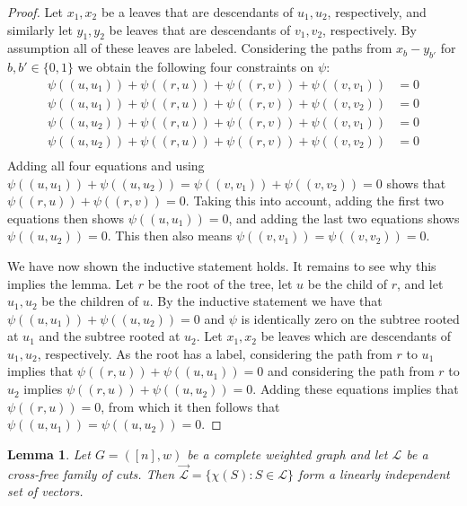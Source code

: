 \documentclass[10pt,a4paper]{article}
\newcommand{\Lcal}{\mathcal{L}}
\newcommand{\1}{\mathbf{1}}
\newtheorem{lemma}[theorem]{Lemma}
\theoremstyle{definition}
\begin{document}
\begin{proof}
Let $x_1,x_2$ be a leaves that are descendants of $u_1,u_2$, respectively, and similarly let $y_1, y_2$ be leaves that are
descendants of $v_1,v_2$, respectively.  By assumption all of these leaves are labeled.  Considering the paths from $x_b-y_{b'}$ for $b,b' \in \{0,1\}$ we obtain
the following four constraints on $\psi$:
\begin{align*}
\psi((u,u_1)) + \psi((r,u)) + \psi((r,v)) + \psi((v,v_1)) &= 0 \\
\psi((u,u_1)) + \psi((r,u)) + \psi((r,v)) + \psi((v,v_2)) &= 0 \\
\psi((u,u_2)) + \psi((r,u)) + \psi((r,v)) + \psi((v,v_1)) &= 0 \\
\psi((u,u_2)) + \psi((r,u)) + \psi((r,v)) + \psi((v,v_2)) &= 0 \\
\end{align*}
Adding all four equations and using $\psi((u,u_1)) + \psi((u,u_2)) = \psi((v,v_1)) + \psi((v,v_2))= 0$ shows that $\psi((r,u)) + \psi((r,v)) = 0$.
Taking this into account, adding the first two equations then shows $\psi((u,u_1)) = 0$, and adding the last two equations shows $\psi((u,u_2)) = 0$.
This then also means $\psi((v,v_1)) = \psi((v,v_2)) = 0$.

We have now shown the inductive statement holds.  It remains to see why this implies the lemma.  Let $r$ be the root of the tree, let $u$ be the
child of $r$, and let $u_1, u_2$ be the children of $u$.  By the inductive statement we have that $\psi((u,u_1)) + \psi((u,u_2)) = 0$ and $\psi$ is
identically zero on the subtree rooted at $u_1$ and the subtree rooted at $u_2$.  Let $x_1,x_2$ be leaves which are descendants of $u_1, u_2$, respectively.
As the root has a label, considering the path from $r$ to $u_1$ implies that $\psi((r,u)) + \psi((u,u_1)) = 0$ and considering the path from $r$ to $u_2$
implies $\psi((r,u)) + \psi((u,u_2)) = 0$.  Adding these equations implies that $\psi((r,u)) = 0$, from which it then follows that $\psi((u,u_1)) = \psi((u,u_2)) = 0$.
\end{proof}

\begin{lemma}
\label{prop:lin_ind}
Let $G = ([n],w)$ be a complete weighted graph and let $\Lcal$ be a cross-free family of cuts.  Then $\vec{\Lcal} = \{\chi(S): S \in \Lcal\}$ form a linearly independent set of vectors.
\end{lemma}
\end{document}
